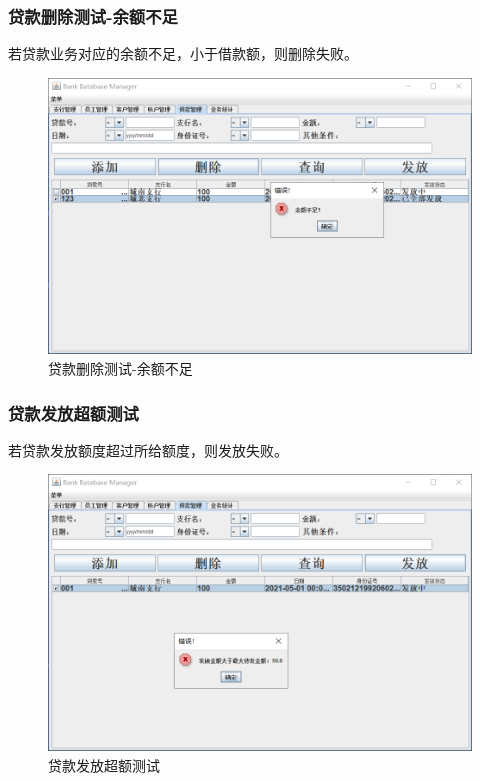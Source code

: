 \documentclass{ctexart}
\begin{document}
\subsubsection{\hei 贷款删除测试-余额不足}
若贷款业务对应的余额不足，小于借款额，则删除失败。
\begin{figure}[H]
    \centering
    \includegraphics[scale=0.2]{yue.png}
    \caption{贷款删除测试-余额不足}
\end{figure}
\subsubsection{\hei 贷款发放超额测试}
若贷款发放额度超过所给额度，则发放失败。
\begin{figure}[H]
    \centering
    \includegraphics[scale=0.2]{dk4.png}
    \caption{贷款发放超额测试}
\end{figure}
\end{document}
